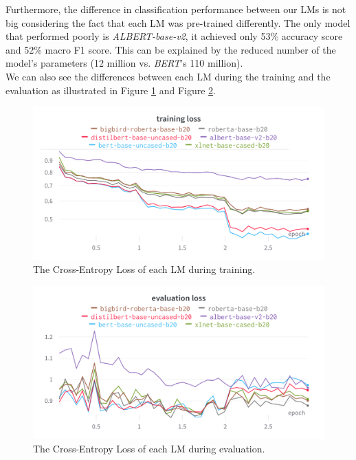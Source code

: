 \documentclass[conference]{IEEEtran}
\begin{document}
Furthermore, the difference in classification performance between our LMs is not big considering the fact that each LM was pre-trained differently. The only model that performed poorly is \textit{ALBERT-base-v2}, it achieved only 53\% accuracy score and 52\% macro F1 score. This can be explained by the reduced number of the model's parameters (12 million vs. \textit{BERT}'s 110 million).\\

We can also see the differences between each LM during the training and the evaluation as illustrated in Figure \ref{fig:train_loss} and Figure \ref{fig:eval_loss}.

\begin{figure}[htp]
    \centering
    \includegraphics[scale=0.13]{train_loss.png}
    \caption[Comparison]{The Cross-Entropy Loss of each LM during training.}
    \label{fig:train_loss}
\end{figure}

\begin{figure}[htp]
    \centering
    \includegraphics[scale=0.13]{eval_loss.png}
    \caption[Comparison]{The Cross-Entropy Loss of each LM during evaluation.}
    \label{fig:eval_loss}
\end{figure}
\end{document}
